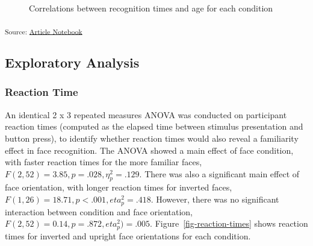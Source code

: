 \documentclass[
  authoryear,
  review,
  3p,
  onecolumn]{elsarticle}
\begin{document}
\label{cell-fig-correlations}
\begin{figure}[H]


\caption{\label{fig-correlations}Correlations between recognition times
and age for each condition}

\end{figure}%

\textsubscript{Source:
\href{https://deborahapthorp.github.io/SelfFaceManuscript/index.qmd.html}{Article
Notebook}}

\subsection{Exploratory Analysis}\label{exploratory-analysis}

\subsubsection{Reaction Time}\label{reaction-time}

An identical 2 x 3 repeated measures ANOVA was conducted on participant
reaction times (computed as the elapsed time between stimulus
presentation and button press), to identify whether reaction times would
also reveal a familiarity effect in face recognition. The ANOVA showed a
main effect of face condition, with faster reaction times for the more
familiar faces, \(F(2, 52) = 3.85, p = .028, \eta_p^2 = .129\). There
was also a significant main effect of face orientation, with longer
reaction times for inverted faces,
\(F(1, 26) = 18.71, p <.001, eta_p^2 = .418\). However, there was no
significant interaction between condition and face orientation,
\(F(2, 52) = 0.14, p = .872, eta_p^2) = .005\).
Figure~\ref{fig-reaction-times} shows reaction times for inverted and
upright face orientations for each condition.
\end{document}

